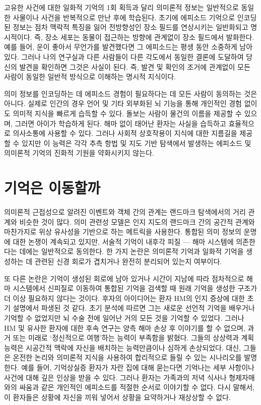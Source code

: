 \documentclass[openany]{book}
\begin{document}
\begin{appendices}
고유한 사건에 대한 일화적 기억의 1회 획득과 달리 의미론적 정보는 일반적으로 동일한 사물이나 사건을 반복적으로 만난 후에 학습된다. 초기에 에피소드 기억으로 인코딩된 정보는 점차 맥락적 특징을 잃어 전방향성인 장소 필드를 연상시키는 일반화되고 명시적이다. 즉, 장소 세포는 동물이 접근하는 방향에 관계없이 장소 필드에서 발화한다. 예를 들어, 운이 좋아서 무언가를 발견했다면 그 에피소드는 평생 동안 소중하게 남아 있다. 그러나 나의 연구실과 다른 사람들이 다른 각도에서 동일한 결론에 도달하여 당신의 발견을 확인하면 그것은 사실이 된다. 즉, 발견 및 확인의 조거에 관계없이 모든 사람이 동일한 일반적 방식으로 이해하는 명시적 지식이다.

의미 정보를 인코딩하는 데 에피소드 경험이 필요하다는 데 모든 사람이 동의하는 것은 아니다. 실제로 인간의 경우 언어 및 기타 외부화된 뇌 기능을 통해 개인적인 경험 없이도 의미적 지식을 빠르게 습득할 수 있다. 돌보는 사람이 물건의 이름을 제공할 수 있으며, 그러면 아이가 학습하게 된다. 해마 없이 태어난 환자는 사실을 습득하고 효율적으로 의사소통에 사용할 수 있다. 그러나 사회적 상호작용이 지식에 대한 지름길을 제공할 수 있지만 이 능력은 각각 추측 항법 및 지도 기반 탐색에서 발생하는 에피소드 및 의미론적 기억의 진화적 기원을 약화시키지 않는다.

\section{기억은 이동할까}
의미론적 근접성으로 알려진 이벤트와 객체 간의 관계는 랜드마크 탐색에서의 거리 관계와 비슷한 것이 많다. 의미 관련성 모델은 인지 지도의 랜드마크 간의 공간적 관계와 마찬가지로 위상 유사성을 기반으로 하는 메트릭을 사용한다. 통합된 의미 정보의 운명에 대한 논쟁이 계속되고 있지만, 서술적 기억이 내후각 피질 — 해마 시스템에 의존한다는 데에는 일반적으로 동의한다. 한 가지 논란은 의미론적 기억과 일화적 기억을 생성하는 데 관련된 신경 회로가 겹치거나 완전히 분리되어 있는지 여부이다.

또 다른 논란은 기억이 생성된 회로에 남아 있거나 시간이 지남에 따라 점차적으로 해마 시스템에서 신피질로 이동하여 통합된 기억을 검색할 때 원래 기억을 생성한 구조가 더 이상 필요하지 않다는 것이다. 후자의 아이디어는 환자 HM의 인지 증상에 대한 초기 설명에서 파생된 것 같다. 초기 분석에 따르면 그는 새로운 선언적 기억을 배우거나 기억할 수 없었지만 뇌 수술 전에 일어난 거의 모든 것을 기억할 수 있었다. 그러나 HM 및 유사한 환자에 대한 후속 연구는 양측 해마 손상 후 이야기를 할 수 없으며, 과거 또는 미래로 `정신적으로 여행’하는 능력이 부족함을 밝혔다. 그들의 상상력과 계획 능력은 시공간적 맥락에 자신을 배치하는 능력만큼이나 심하게 손상되었다. 대신, 그들은 온전한 논리와 의미론적 지식을 사용하여 합리적으로 들릴 수 있는 시나리오를 발명한다. 예를 들어, 기억상실증 환자가 자란 집에 대해 묻는다면 기억나는 세부 사항이나 사건에 대해 깊은 인상을 받을 수 있다. 그러나 환자는 가족과의 저녁 식사나 형제자매와의 싸움과 같은 개인적인 에피소드를 적절한 순서로 이야기할 수 없다. 다시 말해서, 이 환자들은 상황에 자신을 끼워 넣어서 상황을 요약하거나 재상상할 수 없다.


\end{appendices}
\end{document}
